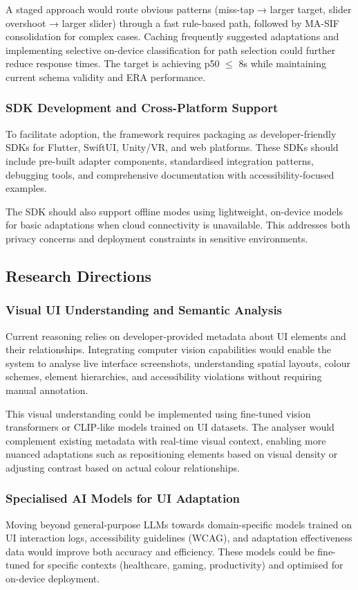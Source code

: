 A staged approach would route obvious patterns (miss-tap → larger target, slider overshoot → larger slider) through a fast rule-based path, followed by MA-SIF consolidation for complex cases. Caching frequently suggested adaptations and implementing selective on-device classification for path selection could further reduce response times. The target is achieving p50 $\leq$ 8s while maintaining current schema validity and ERA performance.

\subsubsection{SDK Development and Cross-Platform Support}
To facilitate adoption, the framework requires packaging as developer-friendly SDKs for Flutter, SwiftUI, Unity/VR, and web platforms. These SDKs should include pre-built adapter components, standardised integration patterns, debugging tools, and comprehensive documentation with accessibility-focused examples.

The SDK should also support offline modes using lightweight, on-device models for basic adaptations when cloud connectivity is unavailable. This addresses both privacy concerns and deployment constraints in sensitive environments.

\subsection{Research Directions}

\subsubsection{Visual UI Understanding and Semantic Analysis}
Current reasoning relies on developer-provided metadata about UI elements and their relationships. Integrating computer vision capabilities would enable the system to analyse live interface screenshots, understanding spatial layouts, colour schemes, element hierarchies, and accessibility violations without requiring manual annotation.

This visual understanding could be implemented using fine-tuned vision transformers or CLIP-like models trained on UI datasets. The analyser would complement existing metadata with real-time visual context, enabling more nuanced adaptations such as repositioning elements based on visual density or adjusting contrast based on actual colour relationships.

\subsubsection{Specialised AI Models for UI Adaptation}
Moving beyond general-purpose LLMs towards domain-specific models trained on UI interaction logs, accessibility guidelines (WCAG), and adaptation effectiveness data would improve both accuracy and efficiency. These models could be fine-tuned for specific contexts (healthcare, gaming, productivity) and optimised for on-device deployment.

